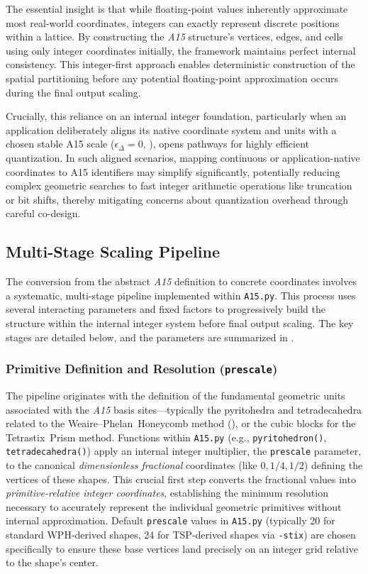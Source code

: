 \documentclass[10pt]{article}
\def\AAAB{\textit{A15}}
\def\WP{Weaire--Phelan}
\def\WPH{\WP{}~Honeycomb}
\def\TSP{Tetrastix~Prism}
\begin{document}
The essential insight is that while floating-point values inherently approximate most real-world coordinates, integers can exactly represent discrete positions within a lattice. By constructing the \AAAB{} structure's vertices, edges, and cells using only integer coordinates initially, the framework maintains perfect internal consistency. This integer-first approach enables deterministic construction of the spatial partitioning before any potential floating-point approximation occurs during the final output scaling.

Crucially, this reliance on an internal integer foundation, particularly when an application deliberately aligns its native coordinate system and units with a chosen stable A15 scale ($\epsilon_\Delta = 0$, ), opens pathways for highly efficient quantization. In such aligned scenarios, mapping continuous or application-native coordinates to A15 identifiers may simplify significantly, potentially reducing complex geometric searches to fast integer arithmetic operations like truncation or bit shifts, thereby mitigating concerns about quantization overhead through careful co-design.

\subsection{Multi-Stage Scaling Pipeline}\label{subsec-scaling-pipeline}

The conversion from the abstract \AAAB{} definition to concrete coordinates involves a systematic, multi-stage pipeline implemented within \texttt{A15.py}. This process uses several interacting parameters and fixed factors to progressively build the structure within the internal integer system before final output scaling. The key stages are detailed below, and the parameters are summarized in .

\subsubsection{Primitive Definition and Resolution (\texttt{prescale})}\label{subsubsec-scaling-prescale}
The pipeline originates with the definition of the fundamental geometric units associated with the \AAAB{} basis sites—typically the pyritohedra and tetradecahedra related to the \WPH{} method (), or the cubic blocks for the \TSP{} method. Functions within \texttt{A15.py} (e.g., \texttt{pyritohedron()}, \texttt{tetradecahedra()}) apply an internal integer multiplier, the \texttt{prescale} parameter, to the canonical \emph{dimensionless fractional} coordinates (like $0, 1/4, 1/2$) defining the vertices of these shapes. This crucial first step converts the fractional values into \emph{primitive-relative integer coordinates}, establishing the minimum resolution necessary to accurately represent the individual geometric primitives without internal approximation. Default \texttt{prescale} values in \texttt{A15.py} (typically \num{20} for standard WPH-derived shapes, \num{24} for TSP-derived shapes via \texttt{-stix}) are chosen specifically to ensure these base vertices land precisely on an integer grid relative to the shape's center.
\end{document}
